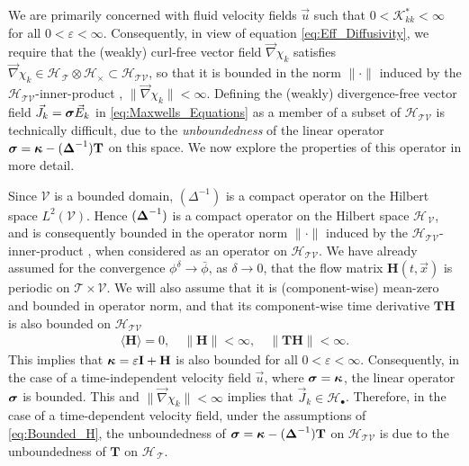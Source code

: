 \documentclass[11pt]{amsart}
\newcommand{\Tb}{\mathbf{T}}
\newcommand{\Hb}{\mathbf{H}}
\newcommand{\Ib}{\mathbf{I}}
\newcommand{\Kc}{\mathcal{K}}
\newcommand{\Tc}{\mathcal{T}}
\newcommand{\Vc}{\mathcal{V}}
\newcommand{\Hs}{\mathscr{H}}
\newcommand\bsig{\mbox{\boldmath${\sigma}$}}
\newcommand\bDelta{\mbox{\boldmath${\Delta}$}}
\newcommand\bkappa{\mbox{\boldmath${\kappa}$}}
\begin{document}
We are primarily concerned with fluid velocity fields $\vec{u}$ such
that $0<\Kc^*_{kk}<\infty$ for all $0<\varepsilon<\infty$. Consequently, in view of
equation \eqref{eq:Eff_Diffusivity}, we require that the (weakly)
curl-free vector field $\vec{\nabla}\chi_k$ satisfies
$\vec{\nabla}\chi_k\in\Hs_{\,\Tc}\otimes\Hs_\times\subset\Hs_{\Tc\Vc}$, so that it is
bounded in the norm $\|\cdot\|$ induced by the $\Hs_{\Tc\Vc}$-inner-product
\cite{Folland:99}, $\|\vec{\nabla}\chi_k\|<\infty$. Defining the (weakly)
divergence-free vector field $\vec{J}_k=\bsig\vec{E}_k$ in
\eqref{eq:Maxwells_Equations} as a member of a subset of
$\Hs_{\Tc\Vc}$ is technically difficult, due to the
\emph{unboundedness} of the linear operator
$\bsig=\bkappa-(\bDelta^{-1})\Tb$ on this space. We now explore the
properties of this operator in more detail.  





Since $\Vc$ is a bounded domain, $(\Delta^{-1})$ is a compact operator
\cite{Stakgold:BVP:2000} on the Hilbert space $L^2(\Vc)$. Hence
$(\bDelta^{-1})$ is a compact operator on the Hilbert space
$\Hs_{\,\Vc}$, and is consequently bounded in the operator norm $\|\cdot\|$
induced by the $\Hs_{\Tc\Vc}$-inner-product
\cite{Reed-1980,Stone:64,Stakgold:BVP:2000}, when considered as an 
operator on $\Hs_{\Tc\Vc}$.  We have already assumed 
for the convergence $\phi^\delta\to\bar{\phi}$, as $\delta\to0$, that the flow matrix
$\Hb(t,\vec{x})$ is periodic on $\Tc\times\Vc$. We will also assume that it
is (component-wise) mean-zero and bounded in operator norm, and that
its component-wise time derivative $\Tb\Hb$ is also bounded on
$\Hs_{\Tc\Vc}$ 
%
\begin{align}\label{eq:Bounded_H}
  \langle\Hb\rangle=0, \quad \|\Hb\|<\infty, \quad \|\Tb\Hb\|<\infty.
\end{align}
%
This implies that $\bkappa=\varepsilon\Ib+\Hb$ is also bounded for all
$0<\varepsilon<\infty$. Consequently, in the case of a time-independent velocity 
field $\vec{u}$, where $\bsig=\bkappa$, the linear operator $\bsig$ is
bounded. This and $\|\vec{\nabla}\chi_k\|<\infty$ implies that 
$\vec{J}_k\in\Hs_\bullet$. Therefore, in the case of a time-dependent velocity
field, under the assumptions of \eqref{eq:Bounded_H}, the
unboundedness of $\bsig=\bkappa-(\bDelta^{-1})\Tb$ on $\Hs_{\Tc\Vc}$
is due to the unboundedness of $\Tb$ on $\Hs_{\,\Tc}$.   
\end{document}
